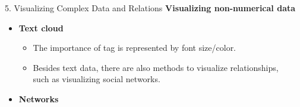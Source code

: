 \begin{frame}{5. Visualizing Complex Data and Relations}
  \textbf{Visualizing non-numerical data}
  \begin{itemize}
  \item \textbf{Text cloud}
    \begin{itemize}
    \item The importance of tag is represented by font size/color.
    \item Besides text data, there are also methods to visualize relationships, \\ such as visualizing social networks.
    \end{itemize}
  \item \textbf{Networks}
  \end{itemize}
\end{frame}

